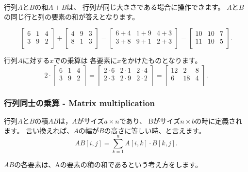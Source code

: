 行列$A$と$B$の和$A+B$は、
行列が同じ大きさである場合に操作できます。
$A$と$B$の同じ行と列の要素の和が答えとなります。

\[
 \begin{bmatrix}
  6 & 1 & 4 \\
  3 & 9 & 2 \\
 \end{bmatrix}
+
 \begin{bmatrix}
  4 & 9 & 3 \\
  8 & 1 & 3 \\
 \end{bmatrix}
=
 \begin{bmatrix}
  6+4 & 1+9 & 4+3 \\
  3+8 & 9+1 & 2+3 \\
 \end{bmatrix}
=
 \begin{bmatrix}
  10 & 10 & 7 \\
  11 & 10 & 5 \\
 \end{bmatrix}.
\]

行列$A$に対する$x$での乗算は
各要素に$x$をかけたものとなります。
\[
 2 \cdot \begin{bmatrix}
  6 & 1 & 4 \\
  3 & 9 & 2 \\
 \end{bmatrix}
=
 \begin{bmatrix}
  2 \cdot 6 & 2\cdot1 & 2\cdot4 \\
  2\cdot3 & 2\cdot9 & 2\cdot2 \\
 \end{bmatrix}
=
 \begin{bmatrix}
  12 & 2 & 8 \\
  6 & 18 & 4 \\
 \end{bmatrix}.
\]

\subsubsection{行列同士の乗算 - Matrix multiplication}


行列$A$と$B$の積$AB$は，$A$がサイズ$a \times n$であり、
Bがサイズ$n \times b$の時に定義されます。
言い換えれば、$A$の幅が$B$の高さに等しい時、と言えます。
\[
AB[i,j] = \sum_{k=1}^n A[i,k] \cdot B[k,j].
\]

$AB$の各要素は、Aの要素の積の和であるという考え方をします。

